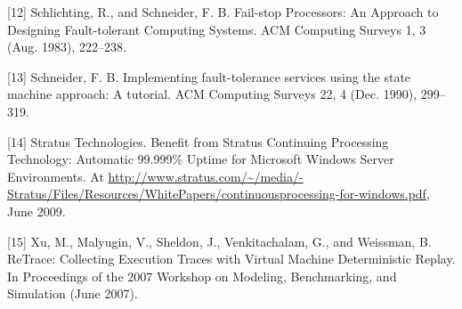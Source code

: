 [12] Schlichting, R., and Schneider, F. B. Fail-stop Processors: An Approach to Designing
Fault-tolerant Computing Systems. ACM Computing Surveys 1, 3 (Aug. 1983), 222--238.

[13] Schneider, F. B. Implementing fault-tolerance services using the state machine
approach: A tutorial. ACM Computing Surveys 22, 4 (Dec. 1990), 299--319.

[14] Stratus Technologies. Benefit from Stratus Continuing Processing Technology:
Automatic 99.999\% Uptime for Microsoft Windows Server Environments. At
\url{http://www.stratus.com/~/media/-Stratus/Files/Resources/WhitePapers/continuousprocessing-for-windows.pdf},
June 2009.

[15] Xu, M., Malyugin, V., Sheldon, J., Venkitachalam, G., and Weissman, B. ReTrace:
Collecting Execution Traces with Virtual Machine Deterministic Replay. In Proceedings of
the 2007 Workshop on Modeling, Benchmarking, and Simulation (June 2007).

\endgroup
